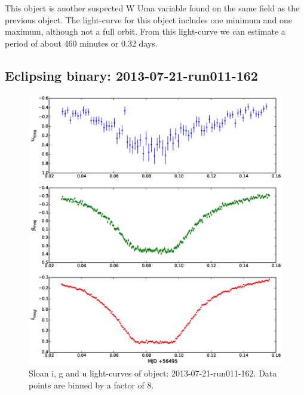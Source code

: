 This object is another suspected {W Uma} variable found on the same field as the previous object. The light-curve for this object includes one minimum and one maximum, although not a full orbit. From this light-curve we can estimate a period of about 460 minutes or 0.32 days.

\subsection{Eclipsing binary: 2013-07-21-run011-162}
  
\begin{figure}
  \center
  \includegraphics[width=120mm]{images/2013-07-21-run011-162_lightcurve-bin8.eps}
  \caption{Sloan i, g and u light-curves of object: 2013-07-21-run011-162. Data points are binned by a factor of 8.}
  \label{fig:2013-07-21-run011-162}
\end{figure}

